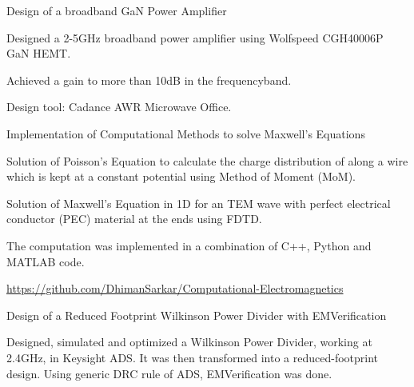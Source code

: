\begin{cventries}
\begin{cventries}

  \cventry
    {Design of a broadband GaN Power Amplifier} %
    {} %
    {} %
    {} %
    {
      \begin{cvitems} %
        \item {Designed a 2-5GHz broadband power amplifier using Wolfspeed CGH40006P GaN HEMT.}
        \item {Achieved a gain to more than 10dB in the frequencyband.}
        \item {Design tool: Cadance AWR Microwave Office.}
      \end{cvitems}
    }


  \cventry
    {Implementation of Computational Methods to solve Maxwell's Equations} %
    {} %
    {} %
    {} %
    {
      \begin{cvitems} %
        \item {Solution of Poisson's Equation to calculate the charge distribution of along a wire which is kept at a constant potential using Method of Moment (MoM).}
        \item {Solution of Maxwell's Equation in 1D for an TEM wave with perfect electrical conductor (PEC) material at the ends using FDTD.}
        \item {The computation was implemented in a combination of C++, Python and MATLAB code.}
        \item {\href{https://github.com/DhimanSarkar/Computational-Electromagnetics}{https://github.com/DhimanSarkar/Computational-Electromagnetics}}
      \end{cvitems}
    }


  \cventry
    {Design of a Reduced Footprint Wilkinson Power Divider with EMVerification} %
    {} %
    {} %
    {} %
    {
      \begin{cvitems} %
        \item {Designed, simulated and optimized a Wilkinson Power Divider, working at 2.4GHz, in Keysight ADS. It was then transformed into a reduced-footprint design. Using generic DRC rule of ADS, EMVerification was done.}
      \end{cvitems}
    }


\end{cventries}
\end{cventries}
